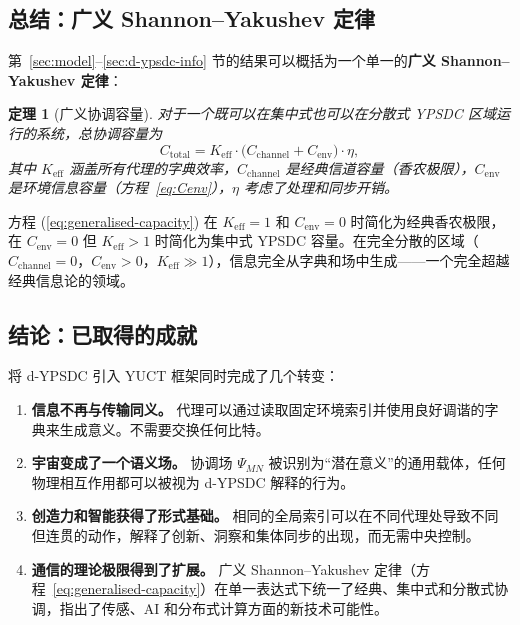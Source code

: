 \documentclass[12pt,a4paper]{article}
\newtheorem{theorem}{定理}[section]
\theoremstyle{remark}
\begin{document}
	\subsection{总结：广义 Shannon–Yakushev 定律}
	\label{subsec:generalised-law}
	
	第~\ref{sec:model}--\ref{sec:d-ypsdc-info} 节的结果可以概括为一个单一的\textbf{广义 Shannon–Yakushev 定律}：
	
	\begin{theorem}[广义协调容量]
		对于一个既可以在集中式也可以在分散式 YPSDC 区域运行的系统，总协调容量为
		\begin{equation}
			\boxed{C_{\mathrm{total}} = K_{\mathrm{eff}} \cdot \bigl(
				C_{\mathrm{channel}} + C_{\mathrm{env}} \bigr) \cdot \eta},
			\label{eq:generalised-capacity}
		\end{equation}
		其中 $K_{\mathrm{eff}}$ 涵盖所有代理的字典效率，$C_{\mathrm{channel}}$ 是经典信道容量（香农极限），$C_{\mathrm{env}}$ 是环境信息容量（方程~\eqref{eq:Cenv}），$\eta$ 考虑了处理和同步开销。
	\end{theorem}
	
	方程 (\ref{eq:generalised-capacity}) 在 $K_{\mathrm{eff}}=1$ 和 $C_{\mathrm{env}}=0$ 时简化为经典香农极限，在 $C_{\mathrm{env}}=0$ 但 $K_{\mathrm{eff}}>1$ 时简化为集中式 YPSDC 容量。在完全分散的区域（$C_{\mathrm{channel}}=0$，$C_{\mathrm{env}}>0$，$K_{\mathrm{eff}}\gg1$），信息完全从字典和场中生成——一个完全超越经典信息论的领域。
	
	\subsection{结论：已取得的成就}
	\label{subsec:conclusions-dypsdc}
	
	将 d-YPSDC 引入 YUCT 框架同时完成了几个转变：
	
	\begin{enumerate}[leftmargin=*]
		\item \textbf{信息不再与传输同义。}
		代理可以通过读取固定环境索引并使用良好调谐的字典来生成意义。不需要交换任何比特。
		\item \textbf{宇宙变成了一个语义场。}
		协调场 $\Psi_{MN}$ 被识别为“潜在意义”的通用载体，任何物理相互作用都可以被视为 d-YPSDC 解释的行为。
		\item \textbf{创造力和智能获得了形式基础。}
		相同的全局索引可以在不同代理处导致不同但连贯的动作，解释了创新、洞察和集体同步的出现，而无需中央控制。
		\item \textbf{通信的理论极限得到了扩展。}
		广义 Shannon–Yakushev 定律（方程~\ref{eq:generalised-capacity}）在单一表达式下统一了经典、集中式和分散式协调，指出了传感、AI 和分布式计算方面的新技术可能性。
	\end{enumerate}
	
\end{document}
